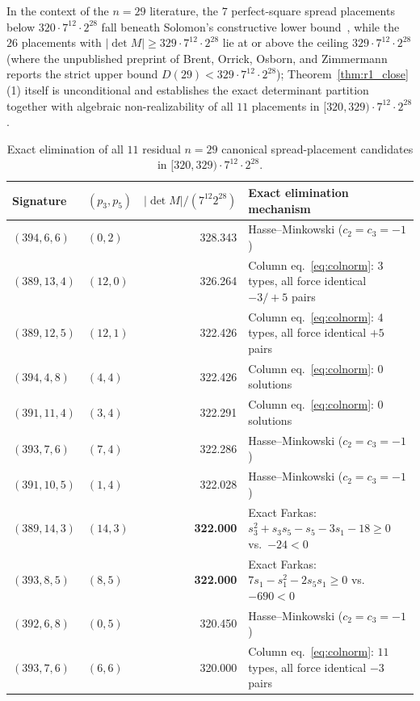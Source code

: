 \documentclass[11pt]{article}
\theoremstyle{remark}
\begin{document}
In the context of the $n = 29$ literature, the $7$ perfect-square spread placements below $320 \cdot 7^{12} \cdot 2^{28}$ fall beneath Solomon's constructive lower bound~\cite{orrick2003,brent2012maxdet}, while the $26$ placements with $|\det M| \ge 329 \cdot 7^{12} \cdot 2^{28}$ lie at or above the ceiling $329 \cdot 7^{12} \cdot 2^{28}$ (where the unpublished preprint of Brent, Orrick, Osborn, and Zimmermann~\cite{brent2012maximal} reports the strict upper bound $D(29) < 329 \cdot 7^{12} \cdot 2^{28}$); Theorem~\ref{thm:r1_close}(1) itself is unconditional and establishes the exact determinant partition together with algebraic non-realizability of all $11$ placements in $[320, 329) \cdot 7^{12} \cdot 2^{28}$.

\begin{table}[ht]
\centering
\caption{Exact elimination of all $11$ residual $n = 29$ canonical spread-placement candidates in $[320, 329) \cdot 7^{12} \cdot 2^{28}$.}
\label{tab:h29close}
\small
\begin{tabular}{llrl}
\toprule
\textbf{Signature} & $(p_3, p_5)$ & $|\det M| / (7^{12} 2^{28})$ & \textbf{Exact elimination mechanism} \\
\midrule
$(394, 6, 6)$  & $(0, 2)$  & 328.343 & Hasse--Minkowski ($c_2 = c_3 = -1$) \\
$(389, 13, 4)$ & $(12, 0)$ & 326.264 & Column eq.~\eqref{eq:colnorm}: $3$ types, all force identical $-3/+5$ pairs \\
$(389, 12, 5)$ & $(12, 1)$ & 322.426 & Column eq.~\eqref{eq:colnorm}: $4$ types, all force identical $+5$ pairs \\
$(394, 4, 8)$  & $(4, 4)$  & 322.426 & Column eq.~\eqref{eq:colnorm}: $0$ solutions \\
$(391, 11, 4)$ & $(3, 4)$  & 322.291 & Column eq.~\eqref{eq:colnorm}: $0$ solutions \\
$(393, 7, 6)$  & $(7, 4)$  & 322.286 & Hasse--Minkowski ($c_2 = c_3 = -1$) \\
$(391, 10, 5)$ & $(1, 4)$  & 322.028 & Hasse--Minkowski ($c_2 = c_3 = -1$) \\
$(389, 14, 3)$ & $(14, 3)$ & \textbf{322.000} & Exact Farkas: $s_3^2 + s_3 s_5 - s_5 - 3s_1 - 18 \ge 0$ vs.\ $-24 < 0$ \\
$(393, 8, 5)$  & $(8, 5)$  & \textbf{322.000} & Exact Farkas: $7 s_1 - s_1^2 - 2 s_5 s_1 \ge 0$ vs.\ $-690 < 0$ \\
$(392, 6, 8)$  & $(0, 5)$  & 320.450 & Hasse--Minkowski ($c_2 = c_3 = -1$) \\
$(393, 7, 6)$  & $(6, 6)$  & 320.000 & Column eq.~\eqref{eq:colnorm}: $11$ types, all force identical $-3$ pairs \\
\bottomrule
\end{tabular}
\end{table}
\end{document}
